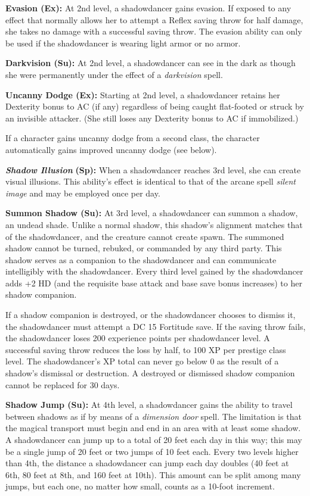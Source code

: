 \documentclass{article}
\begin{document}
\textbf{Evasion (Ex):} At 2nd level, a shadowdancer gains evasion. If exposed to 
any effect that normally allows her to attempt a Reflex saving throw for half damage, 
she takes no damage with a successful saving throw. The evasion ability can only 
be used if the shadowdancer is wearing light armor or no armor.

\textbf{Darkvision (Su): }At 2nd level, a shadowdancer can see in the dark as though 
she were permanently under the effect of a \textit{darkvision }spell.

\textbf{Uncanny Dodge (Ex):} Starting at 2nd level, a shadowdancer retains her 
Dexterity bonus to AC (if any) regardless of being caught flat-footed or struck 
by an invisible attacker. (She still loses any Dexterity bonus to AC if immobilized.)

If a character gains uncanny dodge from a second class, the character automatically 
gains improved uncanny dodge (see below).

\textit{\textbf{Shadow Illusion }}\textbf{(Sp):} When a shadowdancer reaches 3rd 
level, she can create visual illusions. This ability's effect is identical to that 
of the arcane spell \textit{silent image }and may be employed once per day.

\textbf{Summon Shadow (Su):} At 3rd level, a shadowdancer can summon a shadow, 
an undead shade. Unlike a normal shadow, this shadow's alignment matches that of 
the shadowdancer, and the creature cannot create spawn. The summoned shadow cannot 
be turned, rebuked, or commanded by any third party. This shadow serves as a companion 
to the shadowdancer and can communicate intelligibly with the shadowdancer. Every 
third level gained by the shadowdancer adds +2 HD (and the requisite base attack 
and base save bonus increases) to her shadow companion. 

\parindent=3pt
If a shadow companion is destroyed, or the shadowdancer chooses to dismiss it, 
the shadowdancer must attempt a DC 15 Fortitude save. If the saving throw fails, 
the shadowdancer loses 200 experience points per shadowdancer level. A successful 
saving throw reduces the loss by half, to 100 XP per prestige class level. The 
shadowdancer's XP total can never go below 0 as the result of a shadow's dismissal 
or destruction. A destroyed or dismissed shadow companion cannot be replaced for 
30 days.

\parindent=0pt
\textbf{Shadow Jump (Su):} At 4th level, a shadowdancer gains the ability to travel 
between shadows as if by means of a \textit{dimension door }spell. The limitation 
is that the magical transport must begin and end in an area with at least some 
shadow. A shadowdancer can jump up to a total of 20 feet each day in this way; 
this may be a single jump of 20 feet or two jumps of 10 feet each. Every two levels 
higher than 4th, the distance a shadowdancer can jump each day doubles (40 feet 
at 6th, 80 feet at 8th, and 160 feet at 10th). This amount can be split among many 
jumps, but each one, no matter how small, counts as a 10-foot increment.
\end{document}
